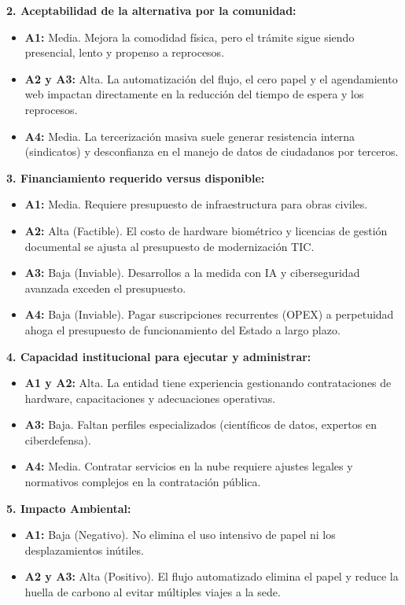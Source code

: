 \textbf{2. Aceptabilidad de la alternativa por la comunidad:}
\begin{itemize}
    \item \textbf{A1:} Media. Mejora la comodidad física, pero el trámite sigue siendo presencial, lento y propenso a reprocesos.
    \item \textbf{A2 y A3:} Alta. La automatización del flujo, el cero papel y el agendamiento web impactan directamente en la reducción del tiempo de espera y los reprocesos.
    \item \textbf{A4:} Media. La tercerización masiva suele generar resistencia interna (sindicatos) y desconfianza en el manejo de datos de ciudadanos por terceros.
\end{itemize}

\textbf{3. Financiamiento requerido versus disponible:}
\begin{itemize}
    \item \textbf{A1:} Media. Requiere presupuesto de infraestructura para obras civiles.
    \item \textbf{A2:} Alta (Factible). El costo de hardware biométrico y licencias de gestión documental se ajusta al presupuesto de modernización TIC.
    \item \textbf{A3:} Baja (Inviable). Desarrollos a la medida con IA y ciberseguridad avanzada exceden el presupuesto.
    \item \textbf{A4:} Baja (Inviable). Pagar suscripciones recurrentes (OPEX) a perpetuidad ahoga el presupuesto de funcionamiento del Estado a largo plazo.
\end{itemize}

\textbf{4. Capacidad institucional para ejecutar y administrar:}
\begin{itemize}
    \item \textbf{A1 y A2:} Alta. La entidad tiene experiencia gestionando contrataciones de hardware, capacitaciones y adecuaciones operativas.
    \item \textbf{A3:} Baja. Faltan perfiles especializados (científicos de datos, expertos en ciberdefensa).
    \item \textbf{A4:} Media. Contratar servicios en la nube requiere ajustes legales y normativos complejos en la contratación pública.
\end{itemize}

\textbf{5. Impacto Ambiental:}
\begin{itemize}
    \item \textbf{A1:} Baja (Negativo). No elimina el uso intensivo de papel ni los desplazamientos inútiles.
    \item \textbf{A2 y A3:} Alta (Positivo). El flujo automatizado elimina el papel y reduce la huella de carbono al evitar múltiples viajes a la sede.
\end{itemize}

